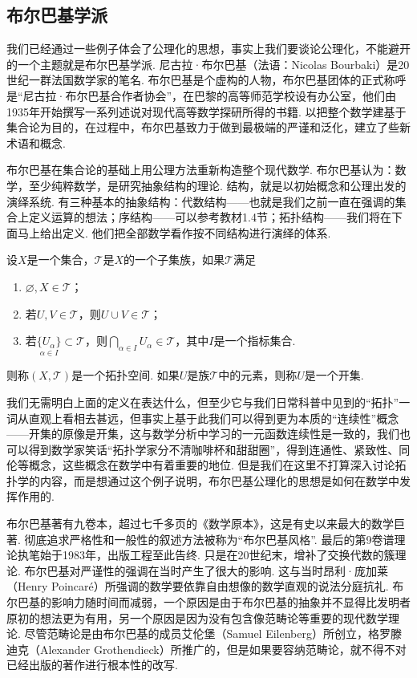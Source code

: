 \subsection{布尔巴基学派}

我们已经通过一些例子体会了公理化的思想，事实上我们要谈论公理化，不能避开的一个主题就是布尔巴基学派. 尼古拉·布尔巴基（法语：Nicolas Bourbaki）是20世纪一群法国数学家的笔名. 布尔巴基是个虚构的人物，布尔巴基团体的正式称呼是``尼古拉·布尔巴基合作者协会''，在巴黎的高等师范学校设有办公室，他们由1935年开始撰写一系列述说对现代高等数学探研所得的书籍. 以把整个数学建基于集合论为目的，在过程中，布尔巴基致力于做到最极端的严谨和泛化，建立了些新术语和概念.

布尔巴基在集合论的基础上用公理方法重新构造整个现代数学. 布尔巴基认为：数学，至少纯粹数学，是研究抽象结构的理论. 结构，就是以初始概念和公理出发的演绎系统. 有三种基本的抽象结构：代数结构——也就是我们之前一直在强调的集合上定义运算的想法；序结构——可以参考教材1.4节；拓扑结构——我们将在下面马上给出定义. 他们把全部数学看作按不同结构进行演绎的体系.

\begin{definition}
    设$X$是一个集合，$\mathscr{T}$是$X$的一个子集族，如果$\mathscr{T}$满足
    \begin{enumerate}
        \item $\varnothing,X\in \mathscr{T}$；

        \item 若$U,V\in \mathscr{T}$，则$U\cup V\in \mathscr{T}$；

        \item 若$\underset{\alpha\in I}{\{U_\alpha\}}\subset \mathscr{T}$，则$\bigcap\limits_{\alpha\in I}U_\alpha\in \mathscr{T}$，其中$I$是一个指标集合.
    \end{enumerate}
    则称$(X,\mathscr{T})$是一个拓扑空间. 如果$U$是族$\mathscr{T}$中的元素，则称$U$是一个开集.
\end{definition}

我们无需明白上面的定义在表达什么，但至少它与我们日常科普中见到的``拓扑''一词从直观上看相去甚远，但事实上基于此我们可以得到更为本质的``连续性''概念——开集的原像是开集，这与数学分析中学习的一元函数连续性是一致的，我们也可以得到数学家笑话``拓扑学家分不清咖啡杯和甜甜圈''，得到连通性、紧致性、同伦等概念，这些概念在数学中有着重要的地位. 但是我们在这里不打算深入讨论拓扑学的内容，而是想通过这个例子说明，布尔巴基公理化的思想是如何在数学中发挥作用的.

布尔巴基著有九卷本，超过七千多页的《数学原本》，这是有史以来最大的数学巨著. 彻底追求严格性和一般性的叙述方法被称为``布尔巴基风格''. 最后的第9卷谱理论执笔始于1983年，出版工程至此告终. 只是在20世纪末，增补了交换代数的簇理论. 布尔巴基对严谨性的强调在当时产生了很大的影响. 这与当时昂利·庞加莱（Henry Poincar\'e）所强调的数学要依靠自由想像的数学直观的说法分庭抗礼. 布尔巴基的影响力随时间而减弱，一个原因是由于布尔巴基的抽象并不显得比发明者原初的想法更为有用，另一个原因是因为没有包含像范畴论等重要的现代数学理论. 尽管范畴论是由布尔巴基的成员艾伦堡（Samuel Eilenberg）所创立，格罗滕迪克（Alexander Grothendieck）所推广的，但是如果要容纳范畴论，就不得不对已经出版的著作进行根本性的改写.

